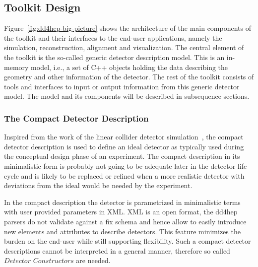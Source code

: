 \subsection{Toolkit Design}
\label{sec:toolkit-design}
\noindent
Figure~\ref{fig:dd4hep-big-picture} shows the architecture 
of the main components of the toolkit and their interfaces 
to the end-user applications, namely the simulation, reconstruction, 
alignment and visualization. 
The central element of the toolkit is the so-called generic detector 
description model. This is an in-memory model, i.e., a set of C++ objects 
holding the data describing the geometry and other information of 
the detector. The rest of the toolkit consists of tools and interfaces 
to input or output information from this generic detector model. 
The model and its components will be described in subsequence sections.

\subsubsection{The Compact Detector Description}
\label{sec:problem_analysis}
\noindent
Inspired from the work of the linear collider detector 
simulation~\cite{bib:Detector,bib:lcsim}, the compact detector description is used
to define an ideal detector as typically used during 
the conceptual design phase of an experiment. 
The compact description in its minimalistic form is probably not going to 
be adequate later in the detector life cycle and
is likely to be replaced or refined when a more realistic detector 
with deviations from the ideal would be needed by the experiment.

\noindent
In the compact description the detector is parametrized in minimalistic terms
with user provided parameters in XML.
XML is an open format, the dd4hep parsers do not validate against a fix schema
and hence allow to easily introduce new elements and attributes to describe 
detectors. This feature minimizes the burden on the end-user while still 
supporting flexibility.
Such a compact detector descriptions cannot be interpreted in a 
general manner, therefore so called $Detector$ $Constructors$ are needed.

